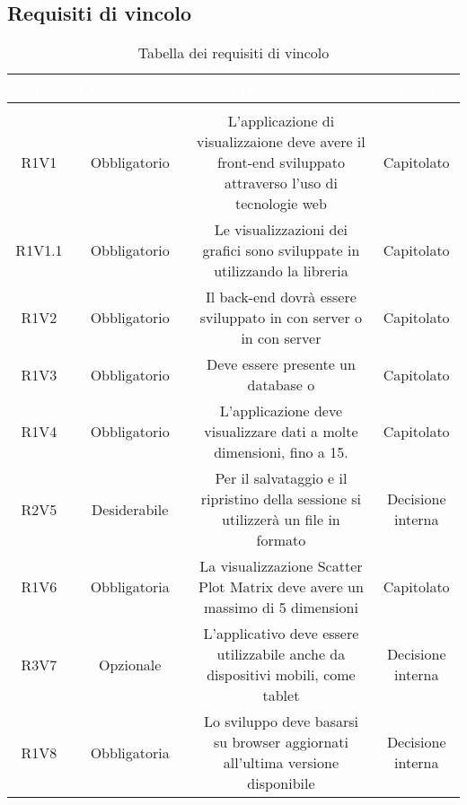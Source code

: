 \subsection{Requisiti di vincolo}
\renewcommand{\arraystretch}{1.5}
\begin{center}
\begin{longtable}{C{\colA} C{\colB} C{\colC} C{\colA}}
		\textcolor{white}{\textbf{Codice}} & 
		\textcolor{white}{\textbf{Classificazione}} & 
		\textcolor{white}{\textbf{Descrizione}} & 
		\textcolor{white}{\textbf{Fonti}} \\
		\endfirsthead
	    \\
	    \endfoot
	    \caption{Tabella dei requisiti di vincolo}
	    \endlastfoot

R1V1 & Obbligatorio & L'applicazione  di visualizzaione deve avere il front-end sviluppato attraverso l'uso di tecnologie web & Capitolato \\
R1V1.1 & Obbligatorio & Le visualizzazioni dei grafici sono sviluppate in  utilizzando la libreria  & Capitolato\\
R1V2 & Obbligatorio & Il back-end dovrà essere sviluppato in  con server  o in  con server  & Capitolato \\
R1V3 & Obbligatorio & Deve essere presente un database  o  & Capitolato\\
R1V4 & Obbligatorio & L'applicazione deve visualizzare dati a molte dimensioni, fino a 15. & Capitolato\\
R2V5 & Desiderabile & Per il salvataggio e il ripristino della sessione si utilizzerà un file in formato  & Decisione interna\\
R1V6 & Obbligatoria & La visualizzazione Scatter Plot Matrix deve avere un massimo di 5 dimensioni & Capitolato\\
R3V7 & Opzionale & L'applicativo deve essere utilizzabile anche da dispositivi mobili, come tablet & Decisione interna\\
R1V8 & Obbligatoria & Lo sviluppo deve basarsi su browser aggiornati all'ultima versione disponibile & Decisione interna\\



\end{longtable}
\end{center}